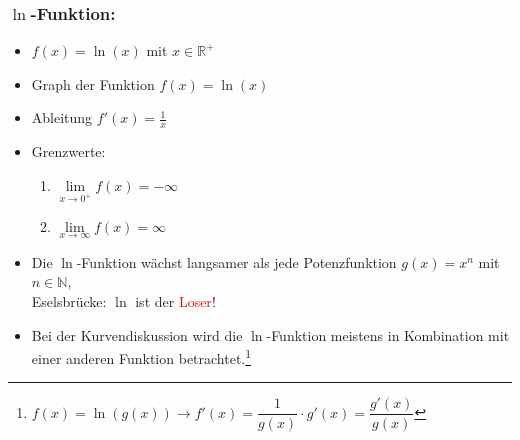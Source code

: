  \subsubsection{$\ln$-Funktion:}
 \begin{itemize}
 \item $f(x) = \ln(x)$ mit $x\in \mathds{R}^+$
 \item Graph der Funktion $f(x)=\ln(x)$\\
\item Ableitung $f'(x) = \frac{1}{x}$
\item Grenzwerte:\\
\begin{enumerate}
\item $\lim \limits_{x\longrightarrow 0^+} f(x) = -\infty$\\
\item $\lim \limits_{x\longrightarrow \infty} f(x) = \infty$
\end{enumerate}
\item \mynote Die $\ln$-Funktion wächst langsamer als jede Potenzfunktion $g(x)= x^n$ mit $n\in\mathds{N}$,\\ \mynote Eselsbrücke: $\ln$ ist der \textcolor{red}{Loser}!
\item Bei der Kurvendiskussion wird die $\ln$-Funktion meistens in Kombination mit einer anderen Funktion betrachtet.\footnote{$f(x) = \ln{(g(x))}  \longrightarrow f'(x) = \dfrac{1}{ g(x)} \cdot g'(x) = \dfrac{g'(x)}{g(x)} $}
 \end{itemize}

